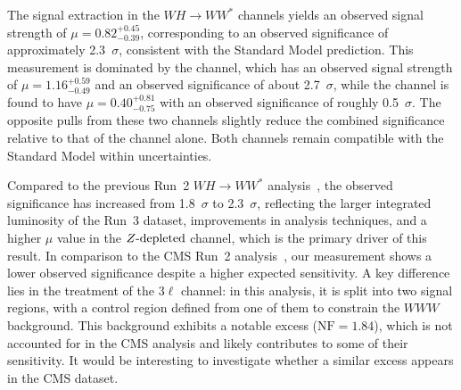 The signal extraction in the $WH\to WW^{*}$ channels yields an observed signal strength of 
$\mu = 0.82^{+0.45}_{-0.39}$, corresponding to an observed significance of approximately 2.3~$\sigma$, 
consistent with the Standard Model prediction. This measurement is dominated by the \zdep{} channel, 
which has an observed signal strength of $\mu = 1.16^{+0.59}_{-0.49}$ and an observed significance of 
about 2.7~$\sigma$, while the \zdom{} channel is found to have
$\mu = 0.40^{+0.81}_{-0.75}$ with an observed significance of roughly 0.5~$\sigma$. 
The opposite pulls from these two channels slightly reduce the combined significance relative to that 
of the \zdep{} channel alone. Both channels remain compatible with the Standard Model within uncertainties.

Compared to the previous Run~2 $WH \to WW^{*}$ analysis~\cite{ATLAS:2025abg}, the observed significance has increased from 1.8~$\sigma$ to 2.3~$\sigma$, reflecting the larger integrated luminosity of the Run~3 dataset, improvements in analysis techniques, and a higher $\mu$ value in the $Z\mathrm{\text{-}depleted}{}$ channel, which is the primary driver of this result. In comparison to the CMS Run~2 analysis~\cite{CMS:2021ixs}, our measurement shows a lower observed significance despite a higher expected sensitivity. A key difference lies in the treatment of the 3$\ell$ channel: in this analysis, it is split into two signal regions, with a control region defined from one of them to constrain the $WWW$ background. This background exhibits a notable excess ($\mathrm{NF} = 1.84$), which is not accounted for in the CMS analysis and likely contributes to some of their sensitivity. It would be interesting to investigate whether a similar excess appears in the CMS dataset.


